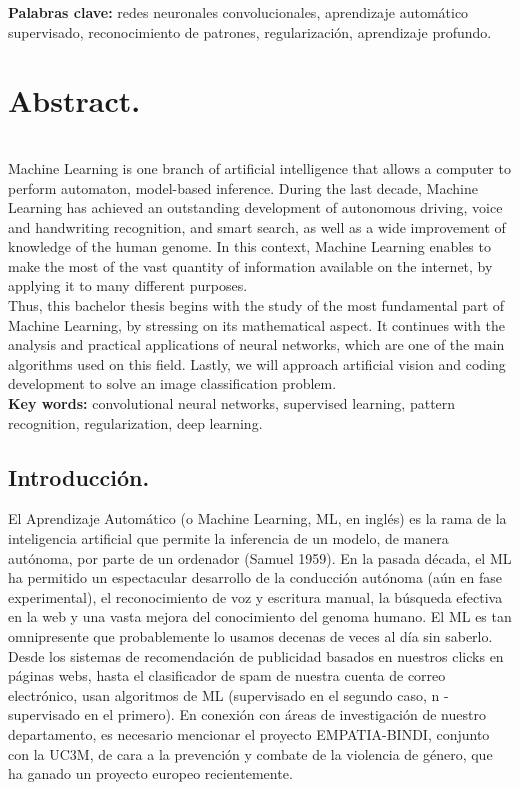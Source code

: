 \documentclass[a4paper,11pt]{article}
\begin{document}
\textbf{Palabras clave:} redes neuronales convolucionales, aprendizaje automático supervisado, reconocimiento de patrones, regularización, aprendizaje profundo.

\newpage

\chapter{\textbf{\large Abstract.}}\\


Machine Learning is one branch of artificial intelligence that allows a computer to perform automaton, model-based inference. During the last decade, Machine Learning has achieved an outstanding development of autonomous driving, voice and handwriting recognition, and smart search, as well as a wide improvement of knowledge of the human genome. In this context, Machine Learning enables to make the most of the vast quantity of information available on the internet, by applying it to many different purposes. \\

\noindent
Thus, this bachelor thesis begins with the study of the most fundamental part of Machine Learning, by stressing on its mathematical aspect. It continues with the analysis and practical applications of neural networks, which are one of the main algorithms used on this field. Lastly, we will approach artificial vision and coding development to solve an image classification problem.\\


\textbf{Key words:} convolutional neural networks, supervised learning, pattern recognition, regularization, deep learning.



\newpage
\section{Introducción.}
El Aprendizaje Automático (o Machine Learning, ML, en inglés) es la rama de la inteligencia artificial que permite la inferencia de un modelo, de manera autónoma, por parte de un ordenador (Samuel 1959). En la pasada década, el ML ha permitido un espectacular desarrollo de la conducción autónoma (aún en fase experimental), el reconocimiento de voz y escritura manual, la búsqueda efectiva en la web y una vasta mejora del conocimiento del genoma humano. El ML es tan omnipresente que probablemente lo usamos decenas de veces al día sin saberlo. Desde los sistemas de recomendación de publicidad basados en nuestros clicks en páginas webs, hasta el clasificador de spam de nuestra cuenta de correo electrónico, usan algoritmos de ML (supervisado en el segundo caso, n -supervisado en el primero). En conexión con áreas de investigación de nuestro departamento, es necesario mencionar el proyecto EMPATIA-BINDI, conjunto con la UC3M, de cara a la prevención y combate de la violencia de género, que ha ganado un proyecto europeo recientemente.\\
\end{document}
